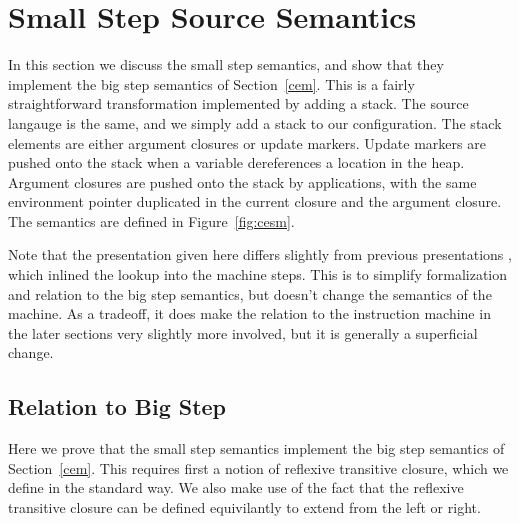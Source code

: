 \section{Small Step Source Semantics}

In this section we discuss the small step semantics, and show that they
implement the big step semantics of Section~\ref{cem}. This is a fairly
straightforward transformation implemented by adding a stack. The source
langauge is the same, and we simply add a stack to our configuration. The stack
elements are either argument closures or update markers. Update markers are
pushed onto the stack when a variable dereferences a location in the heap.
Argument closures are pushed onto the stack by applications, with the same
environment pointer duplicated in the current closure and the argument closure. 
The semantics are defined in Figure~\ref{fig:cesm}.  

Note that the presentation given here differs slightly from previous
presentations \cite{cem}, which inlined the lookup into the machine steps. This
is to simplify formalization and relation to the big step semantics, but doesn't
change the semantics of the machine. As a tradeoff, it does make the relation to
the instruction machine in the later sections very slightly more involved, but
it is generally a superficial change.

\subsection{Relation to Big Step}
Here we prove that the small step semantics implement the big step semantics of
Section~\ref{cem}. This requires first a notion of reflexive transitive closure,
which we define in the standard way. We also make use of the fact that the
reflexive transitive closure can be defined equivilantly to extend from the left
or right. 

